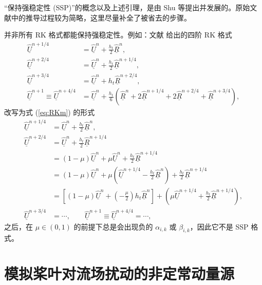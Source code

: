\newpage{}

“保持强稳定性 (SSP)”的概念以及上述引理，是由 Shu 等提出并发展的。原始文献中的推导过程较为简略，这里尽量补全了被省去的步骤。

并非所有 RK 格式都能保持强稳定性。例如：文献 \cite{Hirsch_2007} 给出的四阶 RK 格式
\begin{equation}
\begin{aligned}\underline{\hat{U}}^{n+1/4} & =\underline{\hat{U}}^{n}+\frac{h_{t}}{2}\underline{\hat{R}}^{n},\\
\underline{\hat{U}}^{n+2/4} & =\underline{\hat{U}}^{n}+\frac{h_{t}}{2}\underline{\hat{R}}^{n+1/4},\\
\underline{\hat{U}}^{n+3/4} & =\underline{\hat{U}}^{n}+h_{t}\underline{\hat{R}}^{n+2/4},\\
\underline{\hat{U}}^{n+1}\equiv\underline{\hat{U}}^{n+4/4} & =\underline{\hat{U}}^{n}+\frac{h_{t}}{6}\left(\underline{\hat{R}}^{n}+2\underline{\hat{R}}^{n+1/4}+2\underline{\hat{R}}^{n+2/4}+\underline{\hat{R}}^{n+3/4}\right),
\end{aligned}
\end{equation}
改写为式 (\ref{eq:RKm}) 的形式
\begin{equation}
\begin{aligned}\underline{\hat{U}}^{n+1/4} & =\underline{\hat{U}}^{n}+\frac{h_{t}}{2}\underline{\hat{R}}^{n},\\
\underline{\hat{U}}^{n+2/4} & =\underline{\hat{U}}^{n}+\frac{h_{t}}{2}\underline{\hat{R}}^{n+1/4}\\
 & =(1-\mu)\underline{\hat{U}}^{n}+\mu\underline{\hat{U}}^{n}+\frac{h_{t}}{2}\underline{\hat{R}}^{n+1/4}\\
 & =(1-\mu)\underline{\hat{U}}^{n}+\mu\left(\underline{\hat{U}}^{n+1/4}-\frac{h_{t}}{2}\underline{\hat{R}}^{n}\right)+\frac{h_{t}}{2}\underline{\hat{R}}^{n+1/4}\\
 & =\left[(1-\mu)\underline{\hat{U}}^{n}+\left(-\frac{\mu}{2}\right)h_{t}\underline{\hat{R}}^{n}\right]+\left(\mu\underline{\hat{U}}^{n+1/4}+\frac{h_{t}}{2}\underline{\hat{R}}^{n+1/4}\right),\\
\underline{\hat{U}}^{n+3/4} & =\cdots,\qquad\underline{\hat{U}}^{n+1}\equiv\underline{\hat{U}}^{n+4/4}=\cdots,
\end{aligned}
\end{equation}
之后，在 $\mu\in(0,1)$ 的前提下总是会出现负的 $\alpha_{i,k}$ 或 $\beta_{i,k}$，因此它不是
SSP 格式。

\section{模拟桨叶对流场扰动的非定常动量源\label{sec:UMS}}

